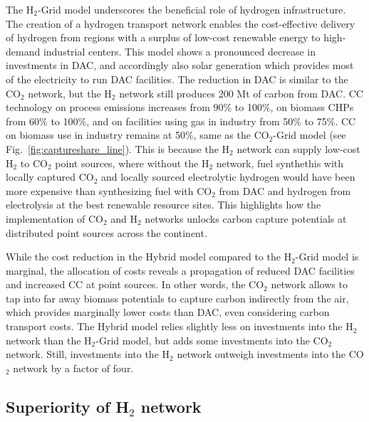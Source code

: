 \documentclass[twocolumn]{article}
\newcommand{\carbon}{CO$_2$}
\newcommand{\hydrogen}{H$_2$}
\newcommand{\modCO}{CO$_2$-Grid model}
\newcommand{\modH}{H$_2$-Grid model}
\begin{document}
The \hydrogen{}-Grid model underscores the beneficial role of hydrogen infrastructure. The creation of a hydrogen transport network enables the cost-effective delivery of hydrogen from regions with a surplus of low-cost renewable energy to high-demand industrial centers. This model shows a pronounced decrease in investments in DAC, and accordingly also solar generation which provides most of the electricity to run DAC facilities. The reduction in DAC is similar to the \carbon{} network, but the \hydrogen{} network still produces 200 Mt of carbon from DAC. CC technology on process emissions increases from 90\% to 100\%, on biomass CHPs from 60\% to 100\%, and on facilities using gas in industry from 50\% to 75\%. CC on biomass use in industry remains at 50\%, same as the \modCO{} (see Fig.~\ref{fig:captureshare_line}). This is because the \hydrogen{} network can supply low-cost \hydrogen{} to \carbon{} point sources, where without the \hydrogen{} network, fuel synthethis with locally captured \carbon{} and locally sourced electrolytic hydrogen would have been more expensive than synthesizing fuel with \carbon{} from DAC and hydrogen from electrolysis at the best renewable resource sites. This highlights how the implementation of \carbon{} and \hydrogen{} networks unlocks carbon capture potentials at distributed point sources across the continent.

While the cost reduction in the Hybrid model compared to the \hydrogen-Grid model is marginal, the allocation of costs reveals a propagation of reduced DAC facilities and increased CC at point sources. In other words, the \carbon{} network allows to tap into far away biomass potentials to capture carbon indirectly from the air, which provides marginally lower costs than DAC, even considering carbon transport costs. The Hybrid model relies slightly less on investments into the \hydrogen{} network than the \modH, but adds some investments into the \carbon{} network. Still, investments into the \hydrogen{} network outweigh investments into the \carbon{} network by a factor of four.

\subsection*{Superiority of \hydrogen{} network}
\end{document}
